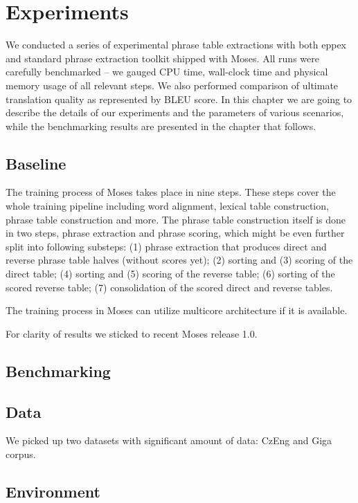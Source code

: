 
\chapter{Experiments}
\label{chap:experiments}

We conducted a series of experimental phrase table extractions with both eppex and
standard phrase extraction toolkit shipped with Moses.
All runs were carefully benchmarked -- we gauged CPU time, wall-clock time and
physical memory usage of all relevant steps.
We also performed comparison of ultimate translation quality as represented by BLEU score.
In this chapter we are going to describe the details of our experiments and
the parameters of various scenarios,
while the benchmarking results are presented in the chapter that follows.

\section{Baseline}

The training process of Moses takes place in nine steps.
These steps cover the whole training pipeline including word alignment, lexical table construction,
phrase table construction and more. The phrase table construction itself is done in two steps,
phrase extraction and phrase scoring, which might be even further split into following
substeps: (1) phrase extraction that produces direct and reverse phrase table halves
(without scores yet); (2) sorting and (3) scoring of the direct table; (4)
sorting and (5) scoring of the reverse table; (6) sorting of the scored
reverse table; (7) consolidation of the scored direct and reverse tables.

The training process in Moses can utilize multicore architecture if it is available.

For clarity of results we sticked to recent Moses release 1.0.

\section{Benchmarking}


\section{Data}

We picked up two datasets with significant amount of data: CzEng and Giga corpus.

\section{Environment}
